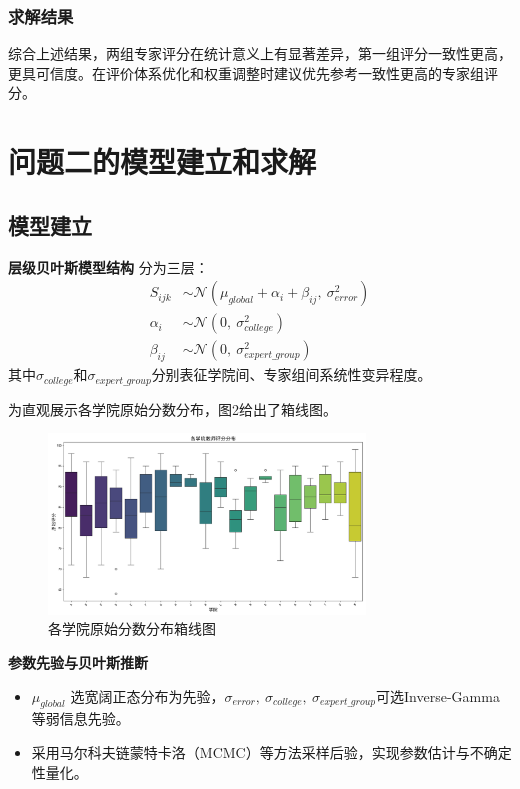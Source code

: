 \documentclass[withoutpreface,bwprint]{cumcmthesis}
\begin{document}
\subsubsection{求解结果}
综合上述结果，两组专家评分在统计意义上有显著差异，第一组评分一致性更高，更具可信度。在评价体系优化和权重调整时建议优先参考一致性更高的专家组评分。


\section{问题二的模型建立和求解}
\subsection{模型建立}
\textbf{层级贝叶斯模型结构}
分为三层：
\begin{align*}
    S_{ijk} &\sim \mathcal{N}(\mu_{global} + \alpha_i + \beta_{ij},\ \sigma_{error}^2) \\
    \alpha_i &\sim \mathcal{N}(0,\ \sigma_{college}^2) \\
    \beta_{ij} &\sim \mathcal{N}(0,\ \sigma_{expert\_group}^2)
\end{align*}
其中$\sigma_{college}$和$\sigma_{expert\_group}$分别表征学院间、专家组间系统性变异程度。

为直观展示各学院原始分数分布，图2给出了箱线图。

\begin{figure}[H]
\centering
\includegraphics[width=0.75\textwidth]{figures/EDA/college_scores_boxplot.png}
\caption{各学院原始分数分布箱线图}
\label{fig:college_scores_boxplot}
\end{figure}

\textbf{参数先验与贝叶斯推断}
\begin{itemize}
    \item $\mu_{global}$ 选宽阔正态分布为先验，$\sigma_{error},\ \sigma_{college},\ \sigma_{expert\_group}$可选Inverse-Gamma等弱信息先验。
    \item 采用马尔科夫链蒙特卡洛（MCMC）等方法采样后验，实现参数估计与不确定性量化。
\end{itemize}
\end{document}

